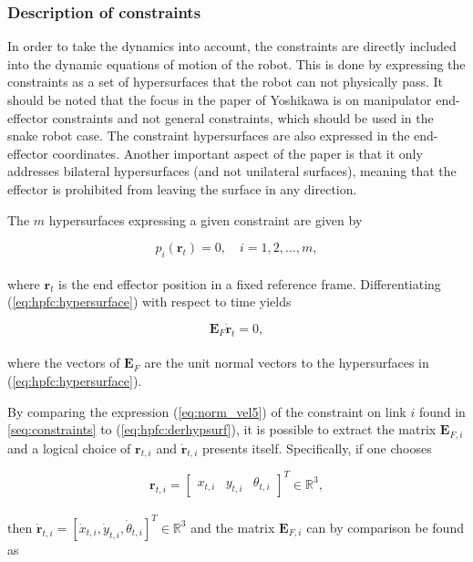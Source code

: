 \subsubsection{Description of constraints}

In order to take the dynamics into account, the constraints are directly included into the dynamic equations of motion of the robot. This is done by expressing the constraints as a set of hypersurfaces that the robot can not physically pass. It should be noted that the focus in the paper of Yoshikawa \cite{yoshikawa1987dynamic} is on manipulator end-effector constraints and not general constraints, which should be used in the snake robot case. The constraint hypersurfaces are also expressed in the end-effector coordinates. Another important aspect of the paper is that it only addresses bilateral hypersurfaces (and not unilateral surfaces), meaning that the effector is prohibited from leaving the surface in any direction.

The $m$ hypersurfaces expressing a given constraint are given by

\begin{equation}\label{eq:hpfc:hypersurface}
    p_i(\mathbf{r}_t) = 0, \quad i = 1, 2, ..., m,
\end{equation}
\\
where $\mathbf{r}_t$ is the end effector position in a fixed reference frame. Differentiating (\ref{eq:hpfc:hypersurface}) with respect to time yields

\begin{equation}\label{eq:hpfc:derhypsurf}
    \mathbf{E}_F \mathbf{\dot{r}}_t = 0,
\end{equation}
\\
where the vectors of $\mathbf{E}_F$ are the unit normal vectors to the hypersurfaces in (\ref{eq:hpfc:hypersurface}).

By comparing the expression (\ref{eq:norm_vel5}) of the constraint on link $i$ found in \ref{seq:constraints} to (\ref{eq:hpfc:derhypsurf}), it is possible to extract the matrix $\mathbf{E}_{F,i}$ and a logical choice of $\mathbf{r}_{t,i}$ and $\mathbf{\dot{r}}_{t,i}$ presents itself.
Specifically, if one chooses

\begin{equation}
    \mathbf{r}_{t,i} =
    \begin{bmatrix}
        x_{t,i} & y_{t,i} & \theta_{t,i}
    \end{bmatrix}^T \in \mathbb{R}^3,
\end{equation}
\\
then $\mathbf{\dot{r}}_{t,i} = [\dot{x}_{t,i}, \dot{y}_{t,i}, \dot{\theta}_{t,i}]^T \in \mathbb{R}^3$ and the matrix $\mathbf{E}_{F,i}$ can by comparison be found as

